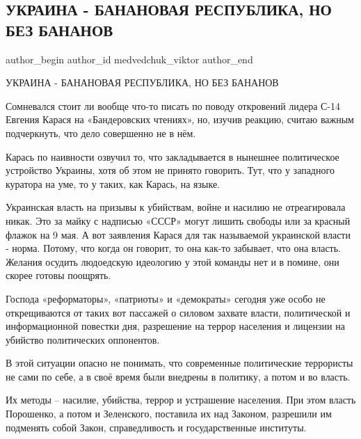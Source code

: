  
 
 
 
 
 
\subsection{УКРАИНА - БАНАНОВАЯ РЕСПУБЛИКА, НО БЕЗ БАНАНОВ}
\label{sec:11_02_2022.tg.medvedchuk_viktor.1.bananovaja_respublika_bez_bananov}
 
\ifcmt
 author_begin
   author_id medvedchuk_viktor
 author_end
\fi

УКРАИНА - БАНАНОВАЯ РЕСПУБЛИКА, НО БЕЗ БАНАНОВ 

Сомневался стоит ли вообще что-то писать по поводу откровений лидера С-14
Евгения Карася на «Бандеровских чтениях», но, изучив реакцию, считаю важным
подчеркнуть, что дело совершенно не в нём.

Карась по наивности озвучил то, что закладывается в нынешнее политическое
устройство Украины, хотя об этом не принято говорить. Тут, что у западного
куратора на уме, то у таких, как Карась, на языке.

Украинская власть на призывы к убийствам, войне и насилию не отреагировала
никак. Это за майку с надписью «СССР» могут лишить свободы или за красный
флажок на 9 мая. А вот заявления Карася для так называемой украинской власти -
норма. Потому, что когда он говорит, то она как-то забывает, что она власть.
Желания осудить людоедскую идеологию у этой команды нет и в помине, они скорее
готовы поощрять.  

Господа «реформаторы», «патриоты» и «демократы» сегодня уже особо не
открещиваются от таких вот пассажей о силовом захвате власти, политической и
информационной повестки дня, разрешение на террор населения и лицензии на
убийство политических оппонентов. 

В этой ситуации опасно не понимать, что современные политические террористы не
сами по себе, а в своё время были внедрены в политику, а потом и во власть.    

Их методы – насилие, убийства, террор и устрашение населения. При этом власть
Порошенко, а потом и Зеленского, поставила их над Законом, разрешили им
подменять собой Закон, справедливость и государственные институты. 

